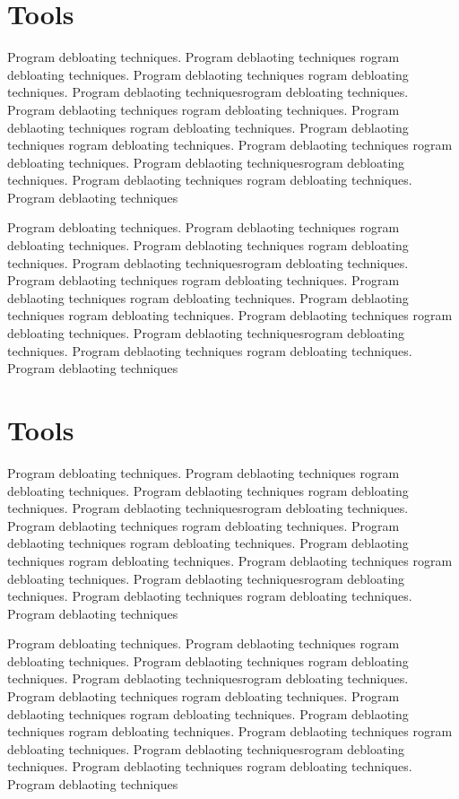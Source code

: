 \documentclass{relatorio}
\begin{document}
\section{Tools}%
\label{Tools}

Program debloating techniques. Program deblaoting techniques rogram debloating techniques. Program deblaoting techniques
rogram debloating techniques. Program deblaoting techniquesrogram debloating techniques. Program deblaoting techniques
rogram debloating techniques. Program deblaoting techniques rogram debloating techniques. Program deblaoting techniques
rogram debloating techniques. Program deblaoting techniques 
rogram debloating techniques. Program deblaoting techniquesrogram debloating techniques. Program deblaoting techniques
rogram debloating techniques. Program deblaoting techniques

Program debloating techniques. Program deblaoting techniques rogram debloating techniques. Program deblaoting techniques
rogram debloating techniques. Program deblaoting techniquesrogram debloating techniques. Program deblaoting techniques
rogram debloating techniques. Program deblaoting techniques rogram debloating techniques. Program deblaoting techniques
rogram debloating techniques. Program deblaoting techniques 
rogram debloating techniques. Program deblaoting techniquesrogram debloating techniques. Program deblaoting techniques
rogram debloating techniques. Program deblaoting techniques	\section{Tools}%
\label{Tools}

Program debloating techniques. Program deblaoting techniques rogram debloating techniques. Program deblaoting techniques
rogram debloating techniques. Program deblaoting techniquesrogram debloating techniques. Program deblaoting techniques
rogram debloating techniques. Program deblaoting techniques rogram debloating techniques. Program deblaoting techniques
rogram debloating techniques. Program deblaoting techniques 
rogram debloating techniques. Program deblaoting techniquesrogram debloating techniques. Program deblaoting techniques
rogram debloating techniques. Program deblaoting techniques

Program debloating techniques. Program deblaoting techniques rogram debloating techniques. Program deblaoting techniques
rogram debloating techniques. Program deblaoting techniquesrogram debloating techniques. Program deblaoting techniques
rogram debloating techniques. Program deblaoting techniques rogram debloating techniques. Program deblaoting techniques
rogram debloating techniques. Program deblaoting techniques 
rogram debloating techniques. Program deblaoting techniquesrogram debloating techniques. Program deblaoting techniques
rogram debloating techniques. Program deblaoting techniques
\end{document}

